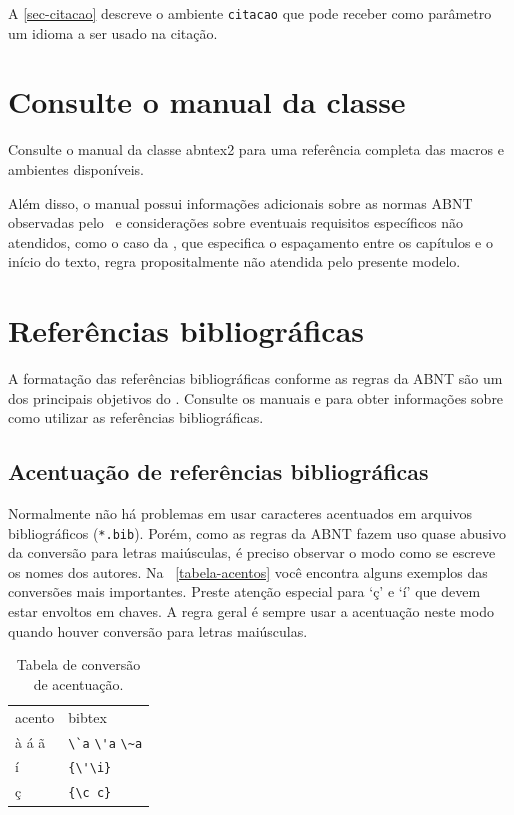 \documentclass[article,12pt,oneside,a4paper,chapter=TITLE,english,brazil]{abntex2}
\begin{document}
\begin{anexosenv}
A \autoref{sec-citacao} descreve o ambiente \texttt{citacao} que pode receber como parâmetro um idioma a ser usado na citação.


\section{Consulte o manual da classe \abnTeX}

Consulte o manual da classe \textsf{abntex2} \cite{abntex2classe} para uma referência completa das macros e ambientes disponíveis. 

Além disso, o manual possui informações adicionais sobre as normas ABNT observadas pelo \abnTeX\ e considerações sobre eventuais requisitos específicos não atendidos, como o caso da , que especifica o espaçamento entre os capítulos e o início do texto, regra propositalmente não atendida pelo presente modelo.


\section{Referências bibliográficas}

A formatação das referências bibliográficas conforme as regras da ABNT são um dos principais objetivos do \abnTeX. Consulte os manuais  e  para obter informações sobre como utilizar as referências bibliográficas.

\subsection{Acentuação de referências bibliográficas}

Normalmente não há problemas em usar caracteres acentuados em arquivos bibliográficos (\texttt{*.bib}). Porém, como as regras da ABNT fazem uso quase abusivo da conversão para letras maiúsculas, é preciso observar o modo como se escreve os nomes dos autores. Na ~\autoref{tabela-acentos} você encontra alguns exemplos das conversões mais importantes. Preste atenção especial para `ç' e `í' que devem estar envoltos em chaves. A regra geral é sempre usar a acentuação neste modo quando houver conversão para letras maiúsculas.
\begin{table}[htbp]
\caption{Tabela de conversão de acentuação.}
\label{tabela-acentos}
\begin{center}
\begin{tabular}{ll}\hline\hline
acento & \textsf{bibtex}\\
à á ã & \verb+\`a+ \verb+\'a+ \verb+\~a+\\
í & \verb+{\'\i}+\\
ç & \verb+{\c c}+\\
\hline\hline
\end{tabular}
\end{center}
\end{table}



\end{anexosenv}
\end{document}
